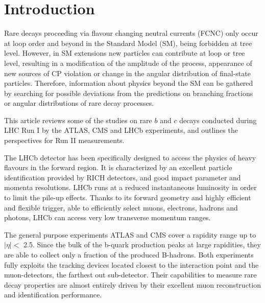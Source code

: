 %
%
%
\section{Introduction}

Rare decays proceeding via flavour changing neutral currents (FCNC) only occur at loop order and beyond in the Standard Model (SM), being forbidden at tree level.
However, in SM extensions new particles can contribute at loop or tree level, resulting in a modification of the amplitude of the process, appearance of new sources of CP violation or change in the angular distribution of final-state particles.
Therefore, information about physics beyond the SM can be gathered by searching for possible deviations from the predictions on branching fractions or angular distributions of rare decay processes.

This article reviews some of the studies on rare $b$ and $c$ decays conducted during LHC Run I by the ATLAS\cite{ATLAS}, CMS\cite{CMS} and LHCb\cite{LHCb} 
experiments, and outlines the perspectives for Run II measurements.

The LHCb detector has been specifically designed to access the physics of heavy flavours in the forward region.
It is characterized by an excellent particle identification provided by RICH detectors, and good impact parameter and momenta resolutions.
LHCb runs at a reduced instantaneous luminosity in order to limit the pile-up effects.
Thanks to its forward geometry and highly efficient and flexible trigger, able to efficiently select muons, electrons, hadrons and photons, LHCb can access very low transverse momentum ranges.

The general purpose experiments ATLAS and CMS cover a rapidity range up to $|\eta | <$ 2.5.
Since the bulk of the b-quark production peaks at large rapidities, they are able to collect only a fraction of the produced B-hadrons.
Both experiments fully exploits the tracking devices located closest to the interaction point and the muon-detectors, the farthest out sub-detector. 
Their capabilities to measure rare decay properties are almost entirely driven by their excellent muon reconstruction and identification performance.

